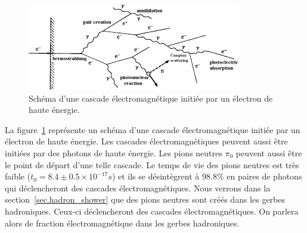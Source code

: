 \begin{figure}[!h]
  \begin{center}
    \includegraphics[width=.4\textwidth]{ShowerTh/figs/electromagnetic_cascade.png}
    \caption{Schéma d'une cascade électromagnétique initiée par un électron de haute énergie.}
    \label{fig:electromagnetic_cascade}
  \end{center}
\end{figure}
La figure~\ref{fig:electromagnetic_cascade} représente un schéma d'une cascade électromagnétique initiée par un électron de haute énergie. Les cascades électromagnétiques peuvent aussi être initiées par des photons de haute énergie. Les pions neutres $\pi_0$ peuvent aussi être le point de départ d'une telle cascade. Le temps de vie des pions neutres est très faible ($t_0=8.4\pm 0.5\times 10^{-17}s$) et ils se désintègrent à 98.8$\%$ en paires de photons qui déclencheront des cascades électromagnétiques. Nous verrons dans la section~\ref{sec.hadron_shower} que des pions neutres sont créés dans les gerbes hadroniques. Ceux-ci déclencheront des cascades électromagnétiques. On parlera alors de fraction électromagnétique dans les gerbes hadroniques.

